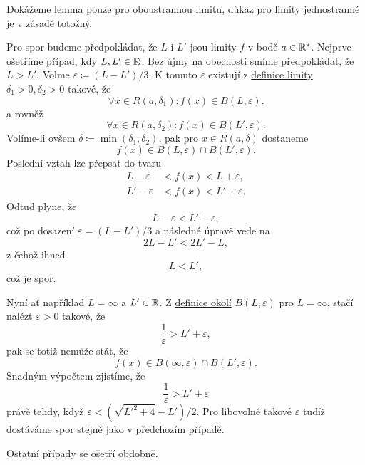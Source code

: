 \begin{lemproof}
	Dokážeme lemma pouze pro oboustrannou limitu, důkaz pro limity jednostranné je
	v zásadě totožný.

	Pro spor budeme předpokládat, že $L$ i $L'$ jsou limity $f$ v bodě $a \in
		\mathbb{R}^{*}$. Nejprve ošetříme případ, kdy $L,L' \in \mathbb{R}$. Bez újmy na obecnosti
	smíme předpokládat, že $L > L'$. Volme $\varepsilon \coloneqq (L-L') / 3$. K
	tomuto $\varepsilon$ existují z
	\hyperref[def:oboustranna-limita-funkce]{definice limity} $\delta_1>0,
		\delta_2>0$ takové,
	že
	\[
		\forall x \in R(a,\delta_1): f(x) \in B(L,\varepsilon).
	\]
	a rovněž
	\[
		\forall x \in R(a,\delta_2): f(x) \in B(L',\varepsilon).
	\]
	Volíme-li ovšem $\delta \coloneqq \min(\delta_1,\delta_2)$, pak pro $x \in
		R(a,\delta)$ dostaneme
	\[
		f(x) \in B(L,\varepsilon) \cap B(L',\varepsilon).
	\]
	Poslední vztah lze přepsat do tvaru
	\begin{align*}
		L - \varepsilon  & < f(x) < L + \varepsilon,  \\
		L' - \varepsilon & < f(x) < L' + \varepsilon.
	\end{align*}
	Odtud plyne, že
	\[
		L - \varepsilon < L' + \varepsilon,
	\]
	což po dosazení $\varepsilon = (L - L') / 3$ a následné úpravě vede na
	\[
		2L - L' < 2L' - L,
	\]
	z čehož ihned
	\[
		L < L',
	\]
	což je spor.

	Nyní ať například $L = \infty$ a $L' \in \mathbb{R}$. Z
	\hyperref[def:okoli-a-prstencove-okoli-bodu]{definice okolí} $B(L,\varepsilon)$
	pro $L = \infty$, stačí nalézt $\varepsilon > 0$ takové, že
	\[
		\frac{1}{\varepsilon} > L' + \varepsilon,
	\]
	pak se totiž nemůže stát, že
	\[
		f(x) \in B(\infty,\varepsilon) \cap B(L',\varepsilon).
	\]
	Snadným výpočtem zjistíme, že
	\[
		\frac{1}{\varepsilon} > L' + \varepsilon
	\]
	právě tehdy, když $\varepsilon < (\sqrt{L'^2 + 4} - L') / 2$. Pro libovolné
	takové $\varepsilon$ tudíž dostáváme spor stejně jako v předchozím případě.

	Ostatní případy se ošetří obdobně.
\end{lemproof}

